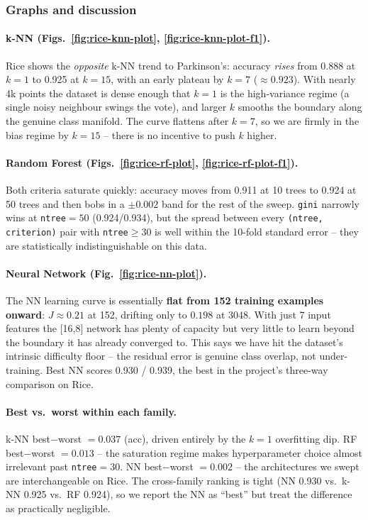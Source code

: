 \documentclass[11pt]{article}
\begin{document}
\subsubsection{Graphs and discussion}

\paragraph{k-NN (Figs.~\ref{fig:rice-knn-plot}, \ref{fig:rice-knn-plot-f1}).}
Rice shows the \emph{opposite} k-NN trend to Parkinson's: accuracy \emph{rises} from 0.888 at $k{=}1$ to 0.925 at $k{=}15$, with an early plateau by $k{=}7$ ($\approx 0.923$). With nearly 4k points the dataset is dense enough that $k{=}1$ is the high-variance regime (a single noisy neighbour swings the vote), and larger $k$ smooths the boundary along the genuine class manifold. The curve flattens after $k{=}7$, so we are firmly in the bias regime by $k{=}15$ -- there is no incentive to push $k$ higher.

\paragraph{Random Forest (Figs.~\ref{fig:rice-rf-plot}, \ref{fig:rice-rf-plot-f1}).}
Both criteria saturate quickly: accuracy moves from 0.911 at 10 trees to 0.924 at 50 trees and then bobs in a $\pm 0.002$ band for the rest of the sweep. \texttt{gini} narrowly wins at \texttt{ntree}$=50$ (0.924/0.934), but the spread between every \texttt{(ntree, criterion)} pair with \texttt{ntree}$\geq 30$ is well within the 10-fold standard error -- they are statistically indistinguishable on this data.

\paragraph{Neural Network (Fig.~\ref{fig:rice-nn-plot}).}
The NN learning curve is essentially \textbf{flat from 152 training examples onward}: $J\approx 0.21$ at 152, drifting only to $0.198$ at 3048. With just 7 input features the [16,8] network has plenty of capacity but very little to learn beyond the boundary it has already converged to. This says we have hit the dataset's intrinsic difficulty floor -- the residual error is genuine class overlap, not under-training. Best NN scores 0.930 / 0.939, the best in the project's three-way comparison on Rice.

\paragraph{Best vs.\ worst within each family.}
k-NN best$-$worst $=0.037$ (acc), driven entirely by the $k{=}1$ overfitting dip. RF best$-$worst $=0.013$ -- the saturation regime makes hyperparameter choice almost irrelevant past \texttt{ntree}$=30$. NN best$-$worst $=0.002$ -- the architectures we swept are interchangeable on Rice. The cross-family ranking is tight (NN 0.930 vs.\ k-NN 0.925 vs.\ RF 0.924), so we report the NN as ``best'' but treat the difference as practically negligible.
\end{document}
